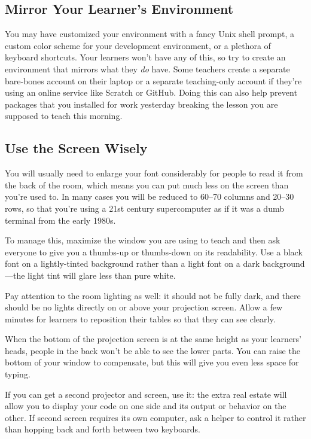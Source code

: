 \subsection*{Mirror Your Learner's Environment}

You may have customized your environment with a fancy Unix shell prompt,
a custom color scheme for your development environment,
or a plethora of keyboard shortcuts.
Your learners won't have any of this,
so try to create an environment that mirrors what they \emph{do} have.
Some teachers create a separate bare-bones account on their laptop
or a separate teaching-only account
if they're using an online service like Scratch or GitHub.
Doing this can also help prevent packages that you installed for work yesterday
breaking the lesson you are supposed to teach this morning.

\subsection*{Use the Screen Wisely}

You will usually need to enlarge your font considerably
for people to read it from the back of the room,
which means you can put much less on the screen than you're used to.
In many cases you will be reduced to 60--70 columns and 20--30 rows,
so that you're using a 21st century supercomputer
as if it was a dumb terminal from the early 1980s.

To manage this,
maximize the window you are using to teach
and then ask everyone to give you a thumbs-up or thumbs-down on its readability.
Use a black font on a lightly-tinted background
rather than a light font on a dark background---the light tint will glare less
than pure white.

Pay attention to the room lighting as well:
it should not be fully dark, and there should be no lights directly
on or above your projection screen.
Allow a few minutes for learners to reposition their tables
so that they can see clearly.

When the bottom of the projection screen is at the same height as your learners' heads,
people in the back won't be able to see the lower parts.
You can raise the bottom of your window to compensate,
but this will give you even less space for typing.

If you can get a second projector and screen,
use it:
the extra real estate will allow you to display your code on one side
and its output or behavior on the other.
If second screen requires its own computer,
ask a helper to control it
rather than hopping back and forth between two keyboards.

